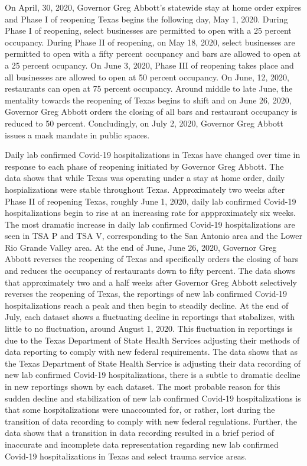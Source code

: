 \documentclass{article}
\begin{document}
\vspace{2mm}

On April, 30, 2020, Governor Greg Abbott's statewide stay at home order expires and Phase I of reopening Texas begins the following day, May 1, 2020. During Phase I of reopening, select businesses are permitted to open with a 25 percent occupancy. During Phase II of reopening, on May 18, 2020, select businesses are permitted to open with a fifty percent occupancy and bars are allowed to open at a 25 percent ocupancy. On June 3, 2020, Phase III of reopening takes place and all businesses are allowed to open at 50 percent occupancy. On June, 12, 2020, restaurants can open at 75 percent occupancy. Around middle to late June, the mentality towards the reopening of Texas begins to shift and on June 26, 2020, Governor Greg Abbott orders the closing of all bars and restaurant occupancy is reduced to 50 percent. Concludingly, on July 2, 2020, Governor Greg Abbott issues a mask mandate in public spaces. 

\vspace{2mm}

Daily lab confirmed Covid-19 hospitalizations in Texas have changed over time in response to each phase of reopening initiated by Governor Greg Abbott. The data shows that while Texas was operating under a stay at home order, daily hospializations were stable throughout Texas. Approximately two weeks after Phase II of reopening Texas, roughly June 1, 2020, daily lab confirmed Covid-19 hospitalizations begin to rise at an increasing rate for appproximately six weeks. The most dramatic increase in daily lab confirmed Covid-19 hospitalizations are seen in TSA P and TSA V, corresponding to the San Antonio area and the Lower Rio Grande Valley area. At the end of June, June 26, 2020, Governor Greg Abbott reverses the reopening of Texas and specifically orders the closing of bars and reduces the occupancy of restaurants down to fifty percent. The data shows that approximately two and a half weeks after Governor Greg Abbott selectively reverses the reopening of Texas, the reportings of new lab confirmed Covid-19 hospitalizations reach a peak and then begin to steadily decline. At the end of July, each dataset shows a fluctuating decline in reportings that stabalizes, with little to no fluctuation, around August 1, 2020. This fluctuation in reportings is due to the Texas Department of State Health Services adjusting their methods of data reporting to comply with new federal requirements. The data shows that as the Texas Department of State Health Service is adjusting their data recording of new lab confirmed Covid-19 hospitalizations, there is a subtle to dramatic decline in new reportings shown by each dataset. The most probable reason for this sudden decline and stabilization of new lab confirmed Covid-19 hospitalizations is that some hospitalizations were unaccounted for, or rather, lost during the transition of data recording to comply with new federal regulations. Further, the data shows that a transition in data recording resulted in a brief period of inaccurate and incomplete data representation regarding new lab confirmed Covid-19 hospitalizations in Texas and select trauma service areas.
\end{document}
